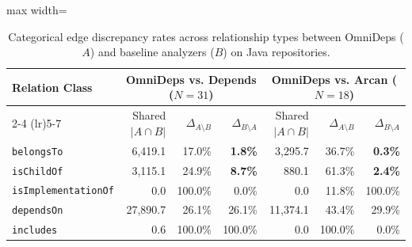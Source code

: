 \begin{table}[htpb]
  \centering
  \small
  \caption{Categorical edge discrepancy rates across relationship
    types between OmniDeps ($A$) and baseline analyzers ($B$) on Java
  repositories.}
  \label{tab:categorical_discordance_java}
  \vspace{0.4em}
  \begin{adjustbox}{max width=\textwidth}
    \begin{tabular}{lrrrrrr}
      \toprule
      \textbf{Relation Class} &
      \multicolumn{3}{c}{\textbf{OmniDeps vs. Depends ($N=31$)}} &
      \multicolumn{3}{c}{\textbf{OmniDeps vs. Arcan ($N=18$)}} \\
      \cmidrule(lr){2-4} \cmidrule(lr){5-7}
      & Shared $|A \cap B|$ & $\Delta_{A \setminus B}$ & $\Delta_{B
      \setminus A}$
      & Shared $|A \cap B|$ & $\Delta_{A \setminus B}$ & $\Delta_{B
      \setminus A}$ \\
      \midrule
      \texttt{belongsTo}          &  6,419.1 & 17.0\% &
      \textbf{1.8\%} &  3,295.7 & 36.7\% & \textbf{0.3\%} \\
      \texttt{isChildOf}          &  3,115.1 & 24.9\% &
      \textbf{8.7\%} &    880.1 & 61.3\% & \textbf{2.4\%} \\
      \texttt{isImplementationOf} &      0.0 & 100.0\% & 0.0\%
      &      0.0 & 11.8\% & 100.0\%        \\
      \texttt{dependsOn}          & 27,890.7 & 26.1\% & 26.1\%
      & 11,374.1 & 43.4\% & 29.9\%         \\
      \texttt{includes}           &      0.6 & 100.0\% & 100.0\%
      &      0.0 & 100.0\% & 0.0\%          \\
      \bottomrule
    \end{tabular}
  \end{adjustbox}
\end{table}

